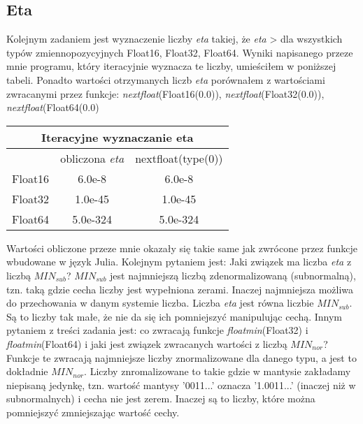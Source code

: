 \documentclass[]{article}
\begin{document}
	
	\subsection*{Eta}
	Kolejnym zadaniem jest wyznaczenie liczby \textit{eta} takiej, że \textit{eta} \textgreater{} dla wszystkich typów zmiennopozycyjnych Float16, Float32, Float64.
	Wyniki napisanego przeze mnie programu, który iteracyjnie wyznacza te liczby, umieściłem w poniższej tabeli. Ponadto wartości otrzymanych liczb \textit{eta} porównałem z wartościami zwracanymi przez funkcje: \mbox{\textit{nextfloat}(Float16(0.0))}, \mbox{\textit{nextfloat}(Float32(0.0))}, \mbox{\textit{nextfloat}(Float64(0.0)}
	\clearpage
	
	\begin{table}[h!]
		\centering
		\label{tab:table1}
		\begin{tabular}{|c|c|c|}
			\multicolumn{3}{c}{Iteracyjne wyznaczanie eta}\\
			\hline
			& obliczona \textit{eta} & nextfloat(type(0))  \\
			\hline
			Float16 & 6.0e-8 & 6.0e-8 \\
			\hline
			Float32 & 1.0e-45 & 1.0e-45 \\
			\hline
			Float64 & 5.0e-324 & 5.0e-324 \\
			\hline
		\end{tabular}
	\end{table}

	Wartości obliczone przeze mnie okazały się takie same jak zwrócone przez funkcje wbudowane w język Julia.
	Kolejnym pytaniem jest: Jaki związek ma liczba \textit{eta} z liczbą $MIN_{sub}$?\newline
	$MIN_{sub}$ jest najmniejszą liczbą zdenormalizowaną (subnormalną), tzn. taką gdzie cecha liczby jest wypełniona zerami. Inaczej najmniejsza możliwa do przechowania w danym systemie liczba. Liczba \textit{eta} jest równa liczbie $MIN_{sub}$. Są to liczby tak małe, że nie da się ich pomniejszyć manipulując cechą.
	\newline
	Innym pytaniem z treści zadania jest: co zwracają funkcje \textit{floatmin}(Float32) i \textit{floatmin}(Float64) i jaki jest związek zwracanych wartości z liczbą $MIN_{nor}$?\newline
	Funkcje te zwracają najmniejsze liczby znormalizowane dla danego typu, a jest to dokładnie $MIN_{nor}$. Liczby znromalizowane to takie gdzie w mantysie zakładamy niepisaną jedynkę, tzn. wartość mantysy '0011...' oznacza '1.0011...' (inaczej niż w subnormalnych) i cecha nie jest zerem. Inaczej są to liczby, które można pomniejszyć zmniejszając wartość cechy.
\end{document}
